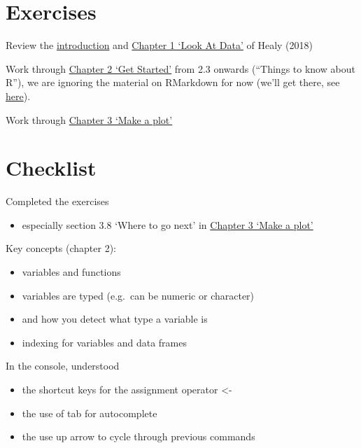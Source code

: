 \documentclass[
]{book}
\providecommand{\tightlist}{%
  \setlength{\itemsep}{0pt}\setlength{\parskip}{0pt}}
\begin{document}
\hypertarget{exercises}{%
\section{Exercises}\label{exercises}}

Review the \href{https://socviz.co}{introduction} and \href{https://socviz.co/lookatdata.html}{Chapter 1 `Look At Data'} of Healy (2018)

Work through \href{https://socviz.co/gettingstarted.html}{Chapter 2 `Get Started'} from 2.3 onwards (``Things to know about R''), we are ignoring the material on RMarkdown for now (we'll get there, see \href{https://tomstafford.github.io/psy6422/rmarkdown.html}{here}).

Work through \href{https://socviz.co/makeplot.html}{Chapter 3 `Make a plot'}

\hypertarget{checklist-1}{%
\section{Checklist}\label{checklist-1}}

Completed the exercises

\begin{itemize}
\tightlist
\item
  especially section 3.8 `Where to go next' in \href{https://socviz.co/makeplot.html}{Chapter 3 `Make a plot'}
\end{itemize}

Key concepts (chapter 2):

\begin{itemize}
\tightlist
\item
  variables and functions
\item
  variables are typed (e.g.~can be numeric or character)
\item
  and how you detect what type a variable is
\item
  indexing for variables and data frames
\end{itemize}

In the console, understood

\begin{itemize}
\tightlist
\item
  the shortcut keys for the assignment operator \textless-
\item
  the use of tab for autocomplete
\item
  the use up arrow to cycle through previous commands
\end{itemize}
\end{document}
